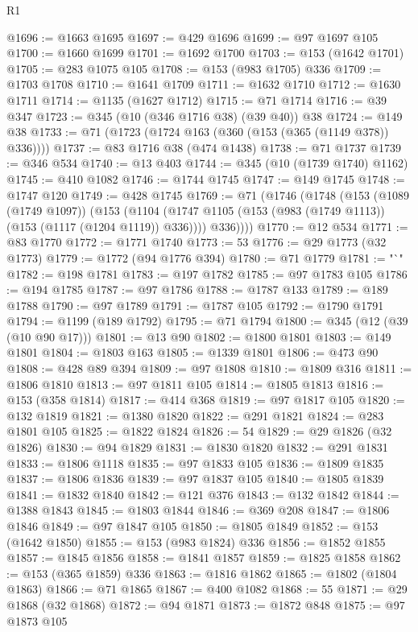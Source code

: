 \begin{lexlean}{R1}
\begin{coremodule}
@1696 := @1663 @1695
@1697 := @429 @1696
@1699 := @97 @1697 @105
@1700 := @1660 @1699
@1701 := @1692 @1700
@1703 := @153 (@1642 @1701)
@1705 := @283 @1075 @105
@1708 := @153 (@983 @1705) @336
@1709 := @1703 @1708
@1710 := @1641 @1709
@1711 := @1632 @1710
@1712 := @1630 @1711
@1714 := @1135 (@1627 @1712)
@1715 := @71 @1714
@1716 := @39 @347
@1723 := @345 (@10 (@346 @1716 @38) (@39 @40)) @38
@1724 := @149 @38
@1733 := @71 (@1723 (@1724 @163 (@360 (@153 (@365 (@1149 @378)) @336))))
@1737 := @83 @1716 @38 (@474 @1438)
@1738 := @71 @1737
@1739 := @346 @534
@1740 := @13 @403
@1744 := @345 (@10 (@1739 @1740) @1162)
@1745 := @410 @1082
@1746 := @1744 @1745
@1747 := @149 @1745
@1748 := @1747 @120
@1749 := @428 @1745
@1769 := @71
    (@1746
      (@1748
        (@153
          (@1089 (@1749 @1097))
          (@153
            (@1104 (@1747 @1105 (@153 (@983 (@1749 @1113)) (@153 (@1117 (@1204 @1119)) @336))))
            @336))))
@1770 := @12 @534
@1771 := @83 @1770
@1772 := @1771 @1740
@1773 := 53
@1776 := @29 @1773 (@32 @1773)
@1779 := @1772 (@94 @1776 @394)
@1780 := @71 @1779
@1781 := "`"
@1782 := @198 @1781
@1783 := @197 @1782
@1785 := @97 @1783 @105
@1786 := @194 @1785
@1787 := @97 @1786
@1788 := @1787 @133
@1789 := @189 @1788
@1790 := @97 @1789
@1791 := @1787 @105
@1792 := @1790 @1791
@1794 := @1199 (@189 @1792)
@1795 := @71 @1794
@1800 := @345 (@12 (@39 (@10 @90 @17)))
@1801 := @13 @90
@1802 := @1800 @1801
@1803 := @149 @1801
@1804 := @1803 @163
@1805 := @1339 @1801
@1806 := @473 @90
@1808 := @428 @89 @394
@1809 := @97 @1808
@1810 := @1809 @316
@1811 := @1806 @1810
@1813 := @97 @1811 @105
@1814 := @1805 @1813
@1816 := @153 (@358 @1814)
@1817 := @414 @368
@1819 := @97 @1817 @105
@1820 := @132 @1819
@1821 := @1380 @1820
@1822 := @291 @1821
@1824 := @283 @1801 @105
@1825 := @1822 @1824
@1826 := 54
@1829 := @29 @1826 (@32 @1826)
@1830 := @94 @1829
@1831 := @1830 @1820
@1832 := @291 @1831
@1833 := @1806 @1118
@1835 := @97 @1833 @105
@1836 := @1809 @1835
@1837 := @1806 @1836
@1839 := @97 @1837 @105
@1840 := @1805 @1839
@1841 := @1832 @1840
@1842 := @121 @376
@1843 := @132 @1842
@1844 := @1388 @1843
@1845 := @1803 @1844
@1846 := @369 @208
@1847 := @1806 @1846
@1849 := @97 @1847 @105
@1850 := @1805 @1849
@1852 := @153 (@1642 @1850)
@1855 := @153 (@983 @1824) @336
@1856 := @1852 @1855
@1857 := @1845 @1856
@1858 := @1841 @1857
@1859 := @1825 @1858
@1862 := @153 (@365 @1859) @336
@1863 := @1816 @1862
@1865 := @1802 (@1804 @1863)
@1866 := @71 @1865
@1867 := @400 @1082
@1868 := 55
@1871 := @29 @1868 (@32 @1868)
@1872 := @94 @1871
@1873 := @1872 @848
@1875 := @97 @1873 @105

\end{coremodule}
\end{lexlean}
